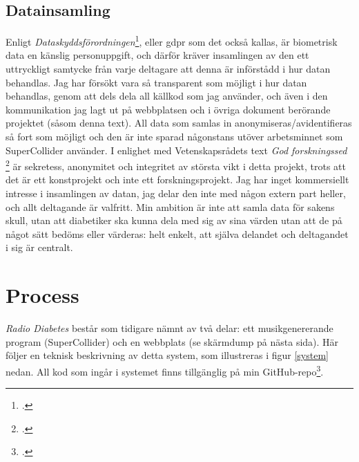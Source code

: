 \documentclass[11pt, a4paper]{article} %
\begin{document}
\subsection*{Datainsamling}
Enligt \emph{Dataskyddsförordningen}\footcite{integritetsskyddsmyndigheten_kansliga_nodate}, eller \gls{gdpr} som det också kallas, är biometrisk data en känslig personuppgift, och därför kräver insamlingen av den ett uttryckligt samtycke från varje deltagare att denna är införstådd i hur datan behandlas. Jag har försökt vara så transparent som möjligt i hur datan behandlas, genom att dels dela all källkod som jag använder, och även i den kommunikation jag lagt ut på webbplatsen och i övriga dokument berörande projektet (såsom denna text). All data som samlas in anonymiseras/avidentifieras så fort som möjligt och den är inte sparad någonstans utöver arbetsminnet som SuperCollider använder. I enlighet med Vetenskapsrådets text \emph{God forskningssed} \footcite[s. 40-41]{vetenskapsradet_god_2017} är sekretess, anonymitet och integritet av största vikt i detta projekt, trots att det är ett konstprojekt och inte ett forskningsprojekt. Jag har inget kommersiellt intresse i insamlingen av datan, jag delar den inte med någon extern part heller, och allt deltagande är valfritt. Min ambition är inte att samla data för sakens skull, utan att diabetiker ska kunna dela med sig av sina värden utan att de på något sätt bedöms eller värderas: helt enkelt, att själva delandet och deltagandet i sig är centralt.

\section*{Process}
\emph{Radio Diabetes} består som tidigare nämnt av två delar: ett musikgenererande program (SuperCollider) och en webbplats (se skärmdump på nästa sida). Här följer en teknisk beskrivning av detta system, som illustreras i figur \ref{system} nedan. All kod som ingår i systemet finns tillgänglig på min GitHub-repo\footcite{jondell_kj-jondellradio-diabetes_2021}.
\end{document}
